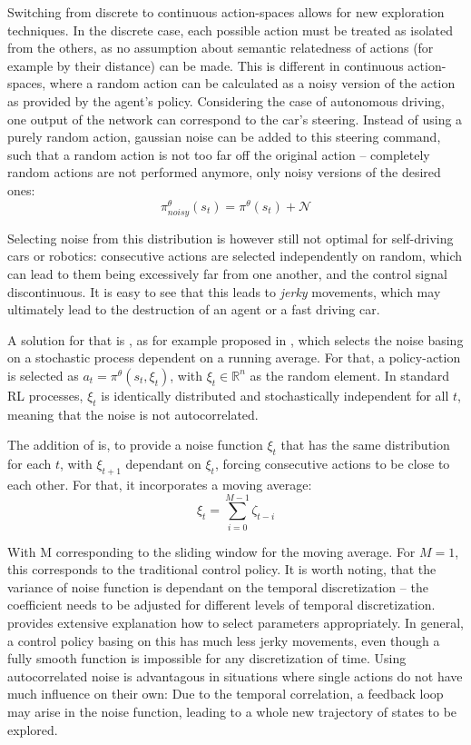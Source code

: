 Switching from discrete to continuous action-spaces allows for new exploration techniques. In the discrete case, each possible action must be treated as isolated from the others, as no assumption about semantic relatedness of actions (for example by their distance) can be made. 
This is different in continuous action-spaces, where a random action can be calculated as a noisy version of the action as provided by the agent's policy. Considering the case of autonomous driving, one output of the network can correspond to the car's steering. Instead of using a purely random action, gaussian noise can be added to this steering command, such that a random action is not too far off the original action -- completely random actions are not performed anymore, only noisy versions of the desired ones:
\begin{equation*}
	\pi^\theta_{noisy}(s_t) = \pi^\theta(s_t) + \mathcal{N}
\end{equation*}

Selecting noise from this distribution is however still not optimal for self-driving cars or robotics: consecutive actions are selected independently on random, which can lead to them being excessively far from one another, and the control signal discontinuous. It is easy to see that this leads to \textit{jerky} movements, which may ultimately lead to the destruction of an agent or a fast driving car. 

A solution for that is , as for example proposed in \cite{wawrzynski_control_2015}, which selects the noise basing on a stochastic process dependent on a running average. For that, a policy-action is selected as $a_t = \pi^\theta(s_t, \xi_t)$, with $\xi_t \in \mathds{R}^n$ as the random element. In standard RL processes, $\xi_t$ is identically distributed and stochastically independent for all $t$, meaning that the noise is not autocorrelated.

The addition of \cite{wawrzynski_control_2015} is, to provide a noise function $\xi_t$ that has the same distribution for each $t$, with $\xi_{t+1}$ dependant on $\xi_t$, forcing consecutive actions to be close to each other. For that, it incorporates a moving average:\\
\begin{equation*}
	\xi_t = \sum^{M-1}_{i=0} \zeta_{t-i}
\end{equation*}

With M corresponding to the sliding window for the moving average. For $M=1$, this corresponds to the traditional control policy. It is worth noting, that the variance of noise function is dependant on the temporal discretization -- the coefficient needs to be adjusted for different levels of temporal discretization. \cite{wawrzynski_control_2015} provides extensive explanation how to select parameters appropriately. In general, a control policy basing on this has much less jerky movements, even though a fully smooth function is impossible for any discretization of time. Using autocorrelated noise is advantagous in situations where single actions do not have much influence on their own: Due to the temporal correlation, a feedback loop may arise in the noise function, leading to a whole new trajectory of states to be explored.

